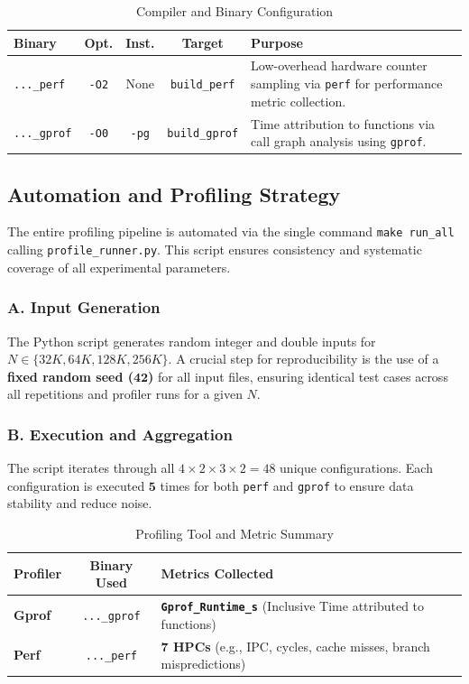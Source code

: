 \documentclass[11pt, a4paper]{article}
\begin{document}
\begin{table}[h]
\centering
\caption{Compiler and Binary Configuration}
\label{tab:compiler_config}
\begin{tabularx}{\textwidth}{l c c c X}
\toprule
\textbf{Binary} & \textbf{Opt.} & \textbf{Inst.} & \textbf{Target} & \textbf{Purpose} \\
\midrule
\texttt{...\_perf} & \texttt{-O2} & None & \texttt{build\_perf} & Low-overhead hardware counter sampling via \texttt{perf} for performance metric collection. \\
\texttt{...\_gprof} & \texttt{-O0} & \texttt{-pg} & \texttt{build\_gprof} & Time attribution to functions via call graph analysis using \texttt{gprof}. \\
\bottomrule
\end{tabularx}
\end{table}

\subsection{Automation and Profiling Strategy}
The entire profiling pipeline is automated via the single command \texttt{make run\_all} calling \texttt{profile\_runner.py}. This script ensures consistency and systematic coverage of all experimental parameters.

\subsubsection{A. Input Generation}
The Python script generates random integer and double inputs for $N \in \{32K, 64K, 128K, 256K\}$. A crucial step for reproducibility is the use of a \textbf{fixed random seed ($\mathbf{42}$)} for all input files, ensuring identical test cases across all repetitions and profiler runs for a given $N$.

\subsubsection{B. Execution and Aggregation}
The script iterates through all $4 \times 2 \times 3 \times 2 = 48$ unique configurations. Each configuration is executed $\mathbf{5}$ times for both \texttt{perf} and \texttt{gprof} to ensure data stability and reduce noise.

\begin{table}[h]
\centering
\caption{Profiling Tool and Metric Summary}
\label{tab:profiling_summary}
\begin{tabularx}{\textwidth}{l c X}
\toprule
\textbf{Profiler} & \textbf{Binary Used} & \textbf{Metrics Collected} \\
\midrule
\textbf{Gprof} & \texttt{...\_gprof} & \textbf{\texttt{Gprof\_Runtime\_s}} (Inclusive Time attributed to functions) \\
\textbf{Perf} & \texttt{...\_perf} & \textbf{7 HPCs} (e.g., IPC, cycles, cache misses, branch mispredictions) \\
\bottomrule
\end{tabularx}
\end{table}
\end{document}
